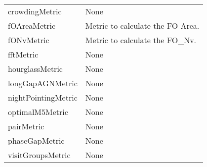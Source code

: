 \begin{tabular}{ll}
                crowdingMetric &                                               None \\
                  fOAreaMetric &                   Metric to calculate the FO Area. \\
                    fONvMetric &                     Metric to calculate the FO\_Nv. \\
                     fftMetric &                                               None \\
               hourglassMetric &                                               None \\
              longGapAGNMetric &                                               None \\
           nightPointingMetric &                                               None \\
               optimalM5Metric &                                               None \\
                    pairMetric &                                               None \\
                phaseGapMetric &                                               None \\
             visitGroupsMetric &                                               None \\
\bottomrule
\end{tabular}
